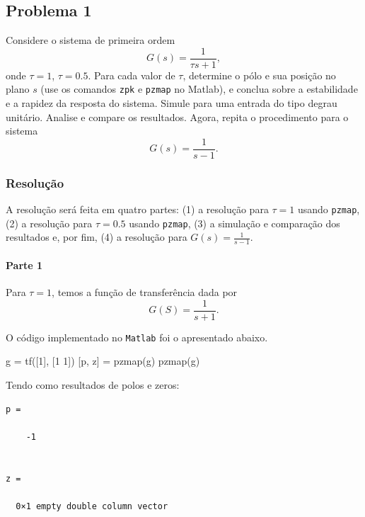 \documentclass[
]{book}
\newenvironment{Shaded}{\begin{snugshade}}{\end{snugshade}}
\newcommand{\FloatTok}[1]{\textcolor[rgb]{0.00,0.00,0.81}{#1}}
\newcommand{\NormalTok}[1]{#1}
\begin{document}
\hypertarget{problema-1}{%
\subsection*{Problema 1}\label{problema-1}}

Considere o sistema de primeira ordem
\[
G(s) = \frac{1}{\tau s +1},
\]
onde \(\tau = 1\), \(\tau = 0.5\). Para cada valor de \(\tau\), determine o pólo e sua posição no plano \(s\) (use os comandos \texttt{zpk} e \texttt{pzmap} no Matlab), e conclua sobre a estabilidade e a rapidez da resposta do sistema. Simule para uma entrada do tipo degrau unitário. Analise e compare os resultados. Agora, repita o procedimento para o sistema
\[
G(s) = \frac{1}{s-1}.
\]

\hypertarget{resoluuxe7uxe3o}{%
\subsubsection*{Resolução}\label{resoluuxe7uxe3o}}

A resolução será feita em quatro partes: (1) a resolução para \(\tau = 1\) usando \texttt{pzmap}, (2) a resolução para \(\tau = 0.5\) usando \texttt{pzmap}, (3) a simulação e comparação dos resultados e, por fim, (4) a resolução para \(G(s) =\frac {1}{s-1}\).

\hypertarget{parte-1}{%
\paragraph{Parte 1}\label{parte-1}}

Para \(\tau = 1\), temos a função de transferência dada por
\[
G(S)= \frac {1}{s+1}.
\]

O código implementado no \texttt{Matlab} foi o apresentado abaixo.

\begin{Shaded}
\begin{Highlighting}[]
\NormalTok{g = tf([}\FloatTok{1}\NormalTok{], [}\FloatTok{1} \FloatTok{1}\NormalTok{])}
\NormalTok{[p, z] = pzmap(g)}
\NormalTok{pzmap(g)}
\end{Highlighting}
\end{Shaded}

Tendo como resultados de polos e zeros:

\begin{verbatim}
p =

    -1


z =

  0×1 empty double column vector
\end{verbatim}
\end{document}
